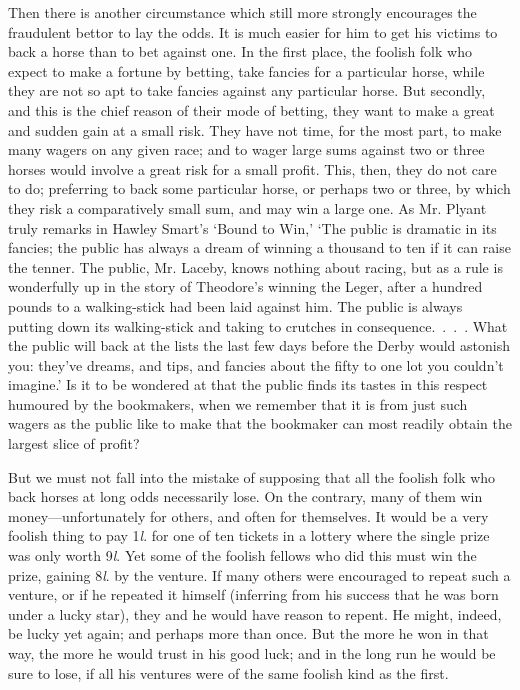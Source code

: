\documentclass[letterpaper,12pt,oneside,openany]{memoir}
\begin{document}
Then there is another circumstance which still more
strongly encourages the fraudulent bettor to lay the
odds. It is much easier for him to get his victims to
back a horse than to bet against one. In the first
place, the foolish folk who expect to make a fortune by
betting, take fancies for a particular horse, while they
are not so apt to take fancies against any particular
horse. But secondly, and this is the chief reason of
their mode of betting, they want to make a great and
sudden gain at a small risk. They have not time, for
the most part, to make many wagers on any given race;
and to wager large sums against two or three horses
would involve a great risk for a small profit. This,
then, they do not care to do; preferring to back some
particular horse, or perhaps two or three, by which they
risk a comparatively small sum, and may win a large
one. As Mr. Plyant truly remarks in Hawley Smart's
`Bound to Win,' `The public is dramatic in its fancies;
the public has always a dream of winning a thousand
to ten if it can raise the tenner. The public, Mr.
Laceby, knows nothing about racing, but as a rule is
wonderfully up in the story of Theodore's winning the
Leger, after a hundred pounds to a walking-stick had
been laid against him. The public is always putting
down its walking-stick and taking to crutches in consequence.~.~.~.
What the public will back at the lists
the last few days before the Derby would astonish you:
they've dreams, and tips, and fancies about the fifty to
one lot you couldn't imagine.' Is it to be wondered at
that the public finds its tastes in this respect humoured
by the bookmakers, when we remember that it is from
just such wagers as the public like to make that the
bookmaker can most readily obtain the largest slice of
profit?

But we must not fall into the mistake of supposing
that all the foolish folk who back horses at long odds
necessarily lose. On the contrary, many of them win
money---unfortunately for others, and often for themselves.
It would be a very foolish thing to pay 1\textit{l}. for
one of ten tickets in a lottery where the single prize
was only worth 9\textit{l}. Yet some of the foolish fellows
who did this must win the prize, gaining 8\textit{l}. by the
venture. If many others were encouraged to repeat
such a venture, or if he repeated it himself (inferring
from his success that he was born under a lucky star),
they and he would have reason to repent. He might,
indeed, be lucky yet again; and perhaps more than
once. But the more he won in that way, the more he
would trust in his good luck; and in the long run he
would be sure to lose, if all his ventures were of the
same foolish kind as the first.
\end{document}
